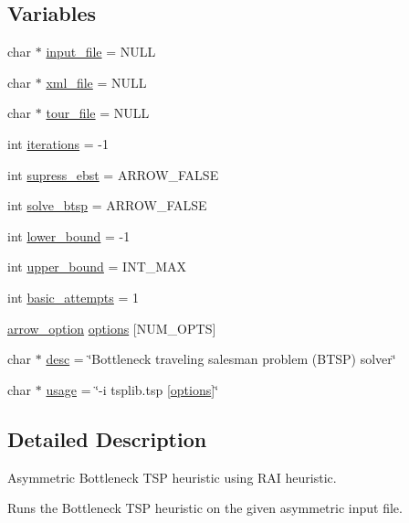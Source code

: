 \subsection*{Variables}
\begin{CompactItemize}
\item 
char $\ast$ \hyperlink{abtsp-rai_8c_a4f3a15de34c409bdec6ceacf93078ed}{input\_\-file} = NULL
\item 
char $\ast$ \hyperlink{abtsp-rai_8c_bf4e392494984c6ef8259268eb1fe421}{xml\_\-file} = NULL
\item 
char $\ast$ \hyperlink{abtsp-rai_8c_b818a82f867be75d7c4d92d792b0943e}{tour\_\-file} = NULL
\item 
int \hyperlink{abtsp-rai_8c_1d10e252e778731e59f0f71afd7e727e}{iterations} = -1
\item 
int \hyperlink{abtsp-rai_8c_502a0aac74d070b870b1c096d9d8520d}{supress\_\-ebst} = ARROW\_\-FALSE
\item 
int \hyperlink{abtsp-rai_8c_de7f7731dd87b73e02ed30fd099d5cc5}{solve\_\-btsp} = ARROW\_\-FALSE
\item 
int \hyperlink{abtsp-rai_8c_ed7394fd8e0c2796b26b9654fd10fd9d}{lower\_\-bound} = -1
\item 
int \hyperlink{abtsp-rai_8c_f5a34eb1d01ffd792adcadc9627ffcb8}{upper\_\-bound} = INT\_\-MAX
\item 
int \hyperlink{abtsp-rai_8c_227b7ec968925f365b96a92ace419c56}{basic\_\-attempts} = 1
\item 
\hyperlink{structarrow__option}{arrow\_\-option} \hyperlink{abtsp-rai_8c_cea6a9709d519c143f30db401a0d0c72}{options} \mbox{[}NUM\_\-OPTS\mbox{]}
\item 
char $\ast$ \hyperlink{abtsp-rai_8c_3aad16fd4bea1b9717f232ea75ad6449}{desc} = \char`\"{}Bottleneck traveling salesman problem (BTSP) solver\char`\"{}
\item 
char $\ast$ \hyperlink{abtsp-rai_8c_adebe2487a2c5240ab6cd02c83add0bf}{usage} = \char`\"{}-i tsplib.tsp \mbox{[}\hyperlink{subprob_8c_cea6a9709d519c143f30db401a0d0c72}{options}\mbox{]}\char`\"{}
\end{CompactItemize}


\subsection{Detailed Description}
Asymmetric Bottleneck TSP heuristic using RAI heuristic. 

Runs the Bottleneck TSP heuristic on the given asymmetric input file.

